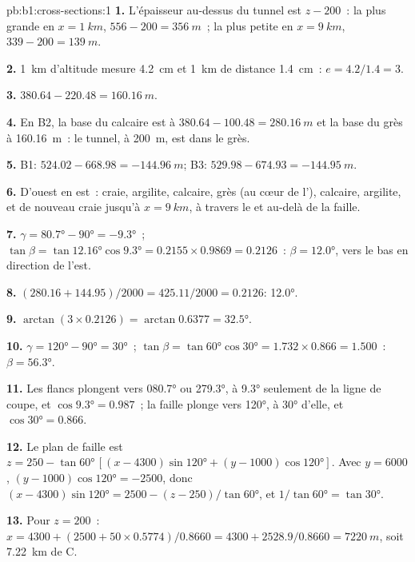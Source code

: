 \begin{solution}{pb:b1:cross-sections:1}
\textbf{1.} L'épaisseur au-dessus du tunnel est $z - 200$~: la plus grande en
$x = \qty{1}{km}$, $556 - 200 = \qty{356}{m}$~; la plus petite en $x =
\qty{9}{km}$, $339 - 200 = \qty{139}{m}$.

\textbf{2.} \qty{1}{km} d'altitude mesure \qty{4.2}{cm} et \qty{1}{km} de
distance \qty{1.4}{cm}~: $e = 4.2/1.4 = 3$.

\textbf{3.} $380.64 - 220.48 = \qty{160.16}{m}$.

\textbf{4.} En B2, la base du calcaire est à $380.64 - 100.48 =
\qty{280.16}{m}$ et la base du grès à \qty{160.16}{m}~: le tunnel, à \qty{200}{m},
est dans le grès.

\textbf{5.} B1: $524.02 - 668.98 = \qty{-144.96}{m}$; B3: $529.98 - 674.93 =
\qty{-144.95}{m}$.

\textbf{6.} D'ouest en est~: craie, argilite, calcaire, grès (au cœur de
l'), calcaire, argilite, et de nouveau craie jusqu'à
$x = \qty{9}{km}$, à travers le  et au-delà de la faille.

\textbf{7.} $\gamma = \ang{80.7} - \ang{90} = \ang{-9.3}$~; $\tan\beta =
\tan\ang{12.16}\cos\ang{9.3} = 0.2155\times0.9869 = 0.2126$~: $\beta =
\ang{12.0}$, vers le bas en direction de l'est.

\textbf{8.} $(280.16 + 144.95)/2000 = 425.11/2000 = 0.2126$: \ang{12.0}.

\textbf{9.} $\arctan(3\times0.2126) = \arctan 0.6377 = \ang{32.5}$.

\textbf{10.} $\gamma = \ang{120} - \ang{90} = \ang{30}$~; $\tan\beta =
\tan\ang{60}\cos\ang{30} = 1.732\times0.866 = 1.500$~: $\beta = \ang{56.3}$.

\textbf{11.} Les flancs plongent vers \ang{080.7} ou \ang{279.3}, à \ang{9.3}
seulement de la ligne de coupe, et $\cos\ang{9.3} = 0.987$~; la faille plonge
vers \ang{120}, à \ang{30} d'elle, et $\cos\ang{30} = 0.866$.

\textbf{12.} Le plan de faille est $z = 250 - \tan\ang{60}\,[(x - 4300)
\sin\ang{120} + (y - 1000)\cos\ang{120}]$. Avec $y = 6000$, $(y - 1000)
\cos\ang{120} = -2500$, donc $(x - 4300)\sin\ang{120} = 2500 - (z - 250)/
\tan\ang{60}$, et $1/\tan\ang{60} = \tan\ang{30}$.

\textbf{13.} Pour $z = 200$~: $x = 4300 + (2500 + 50\times0.5774)/0.8660 =
4300 + 2528.9/0.8660 = \qty{7220}{m}$, soit \qty{7.22}{km} de C.


\end{solution}
